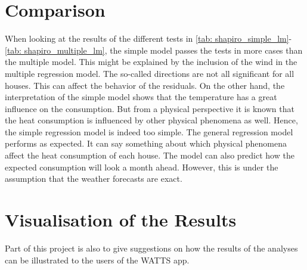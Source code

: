 \section{Comparison}
When looking at the results of the different tests in \cref{tab: shapiro_simple_lm}-\ref{tab: shapiro_multiple_lm}, the simple model passes the tests in more cases than the multiple model. This might be explained by the inclusion of the wind in the multiple regression model. The so-called directions are not all significant for all houses. This can affect the behavior of the residuals. On the other hand, the interpretation of the simple model shows that the temperature has a great influence on the consumption. But from a physical perspective it is known that the heat consumption is influenced by other physical phenomena as well. Hence, the simple regression model is indeed too simple. The general regression model performs as expected. It can say something about which physical phenomena affect the heat consumption of each house. The model can also predict how the expected consumption will look a month ahead. However, this is under the assumption that the weather forecasts are exact. 

\section{Visualisation of the Results}
Part of this project is also to give suggestions on how the results of the analyses can be illustrated to the users of the WATTS app. \\

